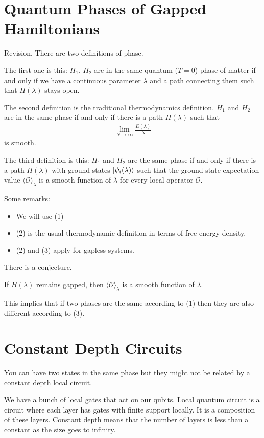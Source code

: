 \section{Quantum Phases of Gapped Hamiltonians}
Revision.
There are two definitions of phase.

The first one is this:
$H_1$, $H_2$ are in the same quantum ($T=0$) phase of matter
if and only if
we have a continuous parameter $\lambda$ and a path connecting them such that
$H(\lambda)$ stays open.

The second definition is the traditional thermodynamics definition.
$H_1$ and $H_2$ are in the same phase if and only if
there is a path $H(\lambda)$ such that
\begin{align}
    \lim_{N\to\infty} \frac{E(\lambda)}{N}
\end{align}
is smooth.

The third definition is this:
$H_1$ and $H_2$ are the same phase if and only if
there is a path $H(\lambda)$
with ground states $\ket{\psi_i(\lambda)}$
such that the ground state expectation value
${\langle\mathcal{O}\rangle}_{\lambda}$
is a smooth function of $\lambda$ for every local operator $\mathcal{O}$.

Some remarks:
\begin{itemize}
    \item We will use (1)
    \item (2) is the usual thermodynamic definition in terms of free energy
        density.
    \item (2) and (3) apply for gapless systems.
\end{itemize}

There is a conjecture.
\begin{conjecture}
    If $H(\lambda)$ remains gapped,
    then ${\langle\mathcal{O}\rangle}_{\lambda}$
    is a smooth function of $\lambda$.
\end{conjecture}
This implies that if two phases are the same according to (1)
then they are also different according to (3).

\section{Constant Depth Circuits}
You can have two states in the same phase
but they might not be related by a constant depth local circuit.

We have a bunch of local gates that act on our qubits.
Local quantum circuit is a circuit where each layer has gates with finite
support locally.
It is a composition of these layers.
Constant depth means that the number of layers is less than a constant as the
size goes to infinity.

